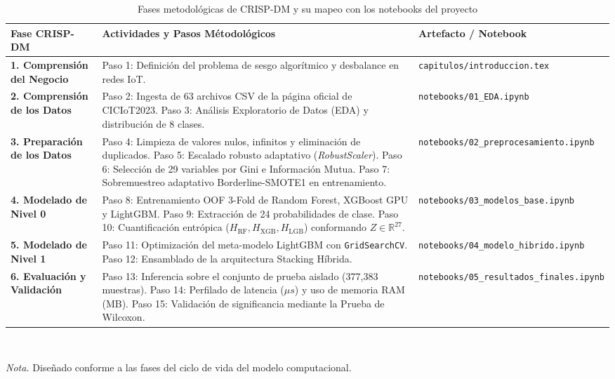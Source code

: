 \begin{table}[H]
\centering
\caption{Fases metodológicas de CRISP-DM y su mapeo con los notebooks del proyecto}
\label{tab:crisp_dm_mm}
\small



\begin{tabularx}{\textwidth}{p{3.5cm} X p{4.0cm}}
\toprule
\textbf{Fase CRISP-DM} & \textbf{Actividades y Pasos Métodológicos} & \textbf{Artefacto / Notebook} \\
\midrule
\textbf{1. Comprensión del Negocio} & Paso 1: Definición del problema de sesgo algorítmico y desbalance en redes IoT. & \texttt{capitulos/introduccion.tex} \\
\textbf{2. Comprensión de los Datos} & Paso 2: Ingesta de 63 archivos CSV de la página oficial de CICIoT2023. \newline Paso 3: Análisis Exploratorio de Datos (EDA) y distribución de 8 clases. & \texttt{notebooks/01\_EDA.ipynb} \\
\textbf{3. Preparación de los Datos} & Paso 4: Limpieza de valores nulos, infinitos y eliminación de duplicados. \newline Paso 5: Escalado robusto adaptativo (\textit{RobustScaler}). \newline Paso 6: Selección de 29 variables por Gini e Información Mutua. \newline Paso 7: Sobremuestreo adaptativo Borderline-SMOTE1 en entrenamiento. & \texttt{notebooks/02\_preprocesamiento.ipynb} \\
\textbf{4. Modelado de Nivel 0} & Paso 8: Entrenamiento OOF 3-Fold de Random Forest, XGBoost GPU y LightGBM. \newline Paso 9: Extracción de 24 probabilidades de clase. \newline Paso 10: Cuantificación entrópica ($H_{\mathrm{RF}}, H_{\mathrm{XGB}}, H_{\mathrm{LGB}}$) conformando $Z \in \mathbb{R}^{27}$. & \texttt{notebooks/03\_modelos\_base.ipynb} \\
\textbf{5. Modelado de Nivel 1} & Paso 11: Optimización del meta-modelo LightGBM con \texttt{GridSearchCV}. \newline Paso 12: Ensamblado de la arquitectura Stacking Híbrida. & \texttt{notebooks/04\_modelo\_hibrido.ipynb} \\
\textbf{6. Evaluación y Validación} & Paso 13: Inferencia sobre el conjunto de prueba aislado (377,383 muestras). \newline Paso 14: Perfilado de latencia ($\mu s$) y uso de memoria RAM (MB). \newline Paso 15: Validación de significancia mediante la Prueba de Wilcoxon. & \texttt{notebooks/05\_resultados\_finales.ipynb} \\
\bottomrule
\end{tabularx}
\\[5pt]
\begin{minipage}{\textwidth}
\small \textit{Nota.} Diseñado conforme a las fases del ciclo de vida del modelo computacional.
\end{minipage}
\end{table}

